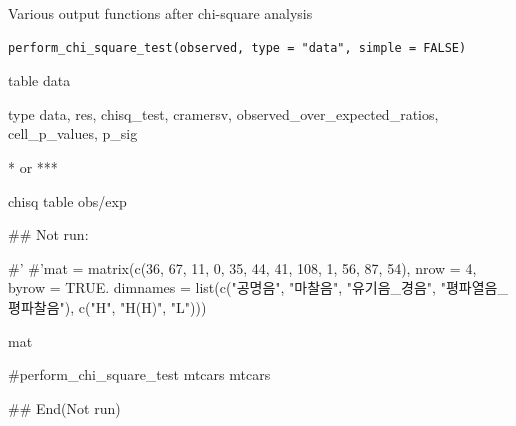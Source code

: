 \documentclass[a4paper]{book}
\begin{document}
%
\begin{Description}
Various output functions after chi-square analysis
\end{Description}
%
\begin{Usage}
\begin{verbatim}
perform_chi_square_test(observed, type = "data", simple = FALSE)
\end{verbatim}
\end{Usage}
%
\begin{Arguments}
\begin{ldescription}
\item[\code{observed}] table data

\item[\code{type}] type data, res, chisq\_test, cramersv, observed\_over\_expected\_ratios, cell\_p\_values, p\_sig

\item[\code{simple}] * or ***
\end{ldescription}
\end{Arguments}
%
\begin{Value}
chisq table obs/exp
\end{Value}
%
\begin{Examples}
\begin{ExampleCode}

\#\# Not run: 

#' #'mat = matrix(c(36, 67, 11,
          0, 35, 44,
         41, 108, 1,
          56, 87, 54),
           nrow = 4, byrow = TRUE.
   dimnames = list(c("공명음", "마찰음",
     "유기음_경음", "평파열음_평파찰음"),  c("H", "H(H)", "L")))

 mat %

 #perform_chi_square_test
mtcars%
mtcars%

## End(Not run)

\end{ExampleCode}
\end{Examples}
\end{document}
